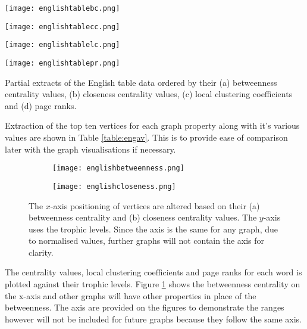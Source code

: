 \begin{table}[!htb]
\centering
\begin{subtable}{.2\textwidth}
	\centering
	\texttt{[image: englishtablebc.png]}
	\caption{}
	\label{table:englishtablebc}
\end{subtable}
\hfill
\begin{subtable}{.2\textwidth}
	\centering
	\texttt{[image: englishtablecc.png]}
	\caption{}
	\label{table:englishtablecc}
\end{subtable}
\hfill
\begin{subtable}{.2\textwidth}
	\centering
	\texttt{[image: englishtablelc.png]}
	\caption{}
	\label{table:englishtablelc}
\end{subtable}
\hfill
\begin{subtable}{.2\textwidth}
	\centering
	\texttt{[image: englishtablepr.png]}
	\caption{}
	\label{table:englishtablepr}
\end{subtable}
\caption{Partial extracts of the English table data ordered by their (a) betweenness centrality values, (b) closeness centrality values, (c) local clustering coefficients and (d) page ranks.}
\label{table:engav}
\end{table}

Extraction of the top ten vertices for each graph property along with it's various values are shown in Table \ref{table:engav}. This is to provide ease of comparison later with the graph visualisations if necessary.

\begin{figure}[!htb]
\centering
\begin{subfigure}{.45\textwidth}
	\hspace{-1.2cm} 
	\texttt{[image: englishbetweenness.png]}
	\caption{}
	\label{fig:engbc}
\end{subfigure}
\hfill
\begin{subfigure}{.45\textwidth}
	\hspace{-1cm} 
	\texttt{[image: englishcloseness.png]}
	\caption{}
	\label{fig:engcc}
\end{subfigure}
\caption{The $x$-axis positioning of vertices are altered based on their (a) betweenness centrality and (b) closeness centrality values. The $y$-axis uses the trophic levels. Since the axis is the same for any graph, due to normalised values, further graphs will not contain the axis for clarity.}
\end{figure}

The centrality values, local clustering coefficients and page ranks for each word is plotted against their trophic levels. Figure \ref{fig:engbc} shows the betweenness centrality on the x-axis and other graphs will have other properties in place of the betweenness. The axis are provided on the figures to demonstrate the ranges however will not be included for future graphs because they follow the same axis.

